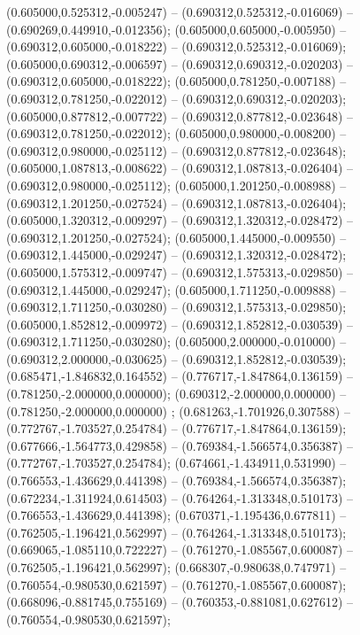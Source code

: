  (0.605000,0.525312,-0.005247) -- (0.690312,0.525312,-0.016069) -- (0.690269,0.449910,-0.012356);
 (0.605000,0.605000,-0.005950) -- (0.690312,0.605000,-0.018222) -- (0.690312,0.525312,-0.016069);
 (0.605000,0.690312,-0.006597) -- (0.690312,0.690312,-0.020203) -- (0.690312,0.605000,-0.018222);
 (0.605000,0.781250,-0.007188) -- (0.690312,0.781250,-0.022012) -- (0.690312,0.690312,-0.020203);
 (0.605000,0.877812,-0.007722) -- (0.690312,0.877812,-0.023648) -- (0.690312,0.781250,-0.022012);
 (0.605000,0.980000,-0.008200) -- (0.690312,0.980000,-0.025112) -- (0.690312,0.877812,-0.023648);
 (0.605000,1.087813,-0.008622) -- (0.690312,1.087813,-0.026404) -- (0.690312,0.980000,-0.025112);
 (0.605000,1.201250,-0.008988) -- (0.690312,1.201250,-0.027524) -- (0.690312,1.087813,-0.026404);
 (0.605000,1.320312,-0.009297) -- (0.690312,1.320312,-0.028472) -- (0.690312,1.201250,-0.027524);
 (0.605000,1.445000,-0.009550) -- (0.690312,1.445000,-0.029247) -- (0.690312,1.320312,-0.028472);
 (0.605000,1.575312,-0.009747) -- (0.690312,1.575313,-0.029850) -- (0.690312,1.445000,-0.029247);
 (0.605000,1.711250,-0.009888) -- (0.690312,1.711250,-0.030280) -- (0.690312,1.575313,-0.029850);
 (0.605000,1.852812,-0.009972) -- (0.690312,1.852812,-0.030539) -- (0.690312,1.711250,-0.030280);
 (0.605000,2.000000,-0.010000) -- (0.690312,2.000000,-0.030625) -- (0.690312,1.852812,-0.030539);
 (0.685471,-1.846832,0.164552) -- (0.776717,-1.847864,0.136159) -- (0.781250,-2.000000,0.000000);
 (0.690312,-2.000000,0.000000) -- (0.781250,-2.000000,0.000000) ;
 (0.681263,-1.701926,0.307588) -- (0.772767,-1.703527,0.254784) -- (0.776717,-1.847864,0.136159);
 (0.677666,-1.564773,0.429858) -- (0.769384,-1.566574,0.356387) -- (0.772767,-1.703527,0.254784);
 (0.674661,-1.434911,0.531990) -- (0.766553,-1.436629,0.441398) -- (0.769384,-1.566574,0.356387);
 (0.672234,-1.311924,0.614503) -- (0.764264,-1.313348,0.510173) -- (0.766553,-1.436629,0.441398);
 (0.670371,-1.195436,0.677811) -- (0.762505,-1.196421,0.562997) -- (0.764264,-1.313348,0.510173);
 (0.669065,-1.085110,0.722227) -- (0.761270,-1.085567,0.600087) -- (0.762505,-1.196421,0.562997);
 (0.668307,-0.980638,0.747971) -- (0.760554,-0.980530,0.621597) -- (0.761270,-1.085567,0.600087);
 (0.668096,-0.881745,0.755169) -- (0.760353,-0.881081,0.627612) -- (0.760554,-0.980530,0.621597);
